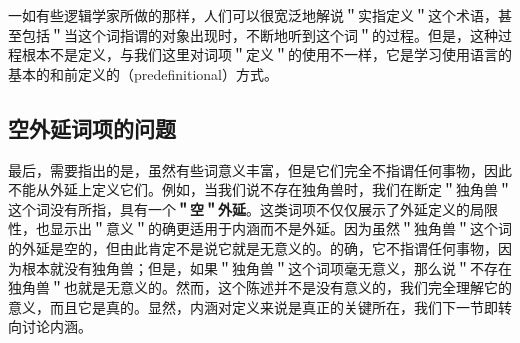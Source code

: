 一如有些逻辑学家所做的那样，人们可以很宽泛地解说＂实指定义＂这个术语，甚至包括＂当这个词指谓的对象出现时，不断地听到这个词＂的过程。但是，这种过程根本不是定义，与我们这里对词项＂定义＂的使用不一样，它是学习使用语言的基本的和前定义的（predefinitional）方式。

\subsection{空外延词项的问题}

最后，需要指出的是，虽然有些词意义丰富，但是它们完全不指谓任何事物，因此不能从外延上定义它们。例如，当我们说不存在独角兽时，我们在断定＂独角兽＂这个词没有所指，具有一个\textbf{＂空＂外延}。这类词项不仅仅展示了外延定义的局限性，也显示出＂意义＂的确更适用于内涵而不是外延。因为虽然＂独角兽＂这个词的外延是空的，但由此肯定不是说它就是无意义的。的确，它不指谓任何事物，因为根本就没有独角兽；但是，如果＂独角兽＂这个词项毫无意义，那么说＂不存在独角兽＂也就是无意义的。然而，这个陈述并不是没有意义的，我们完全理解它的意义，而且它是真的。显然，内涵对定义来说是真正的关键所在，我们下一节即转向讨论内涵。

\begin{center}
\end{center} 